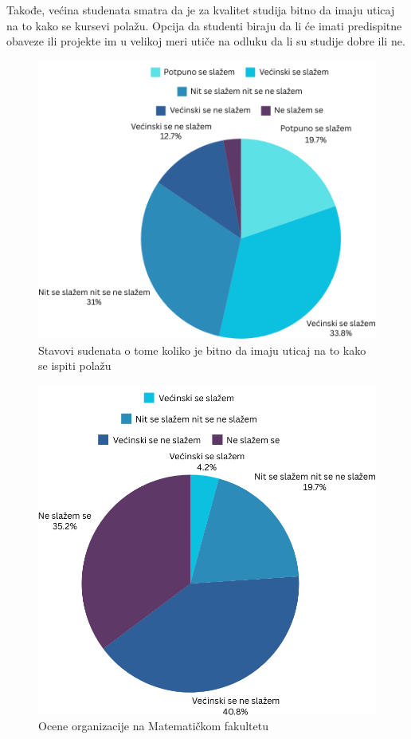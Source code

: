\documentclass[a4paper]{article}
\begin{document}
{Takođe, većina studenata smatra da je za kvalitet studija bitno da imaju uticaj na to kako se kursevi polažu. Opcija da studenti biraju da li će imati predispitne obaveze ili projekte im u velikoj meri utiče na odluku da li su studije dobre ili ne.
\begin{figure}[h!]
\begin{center}
    \includegraphics[scale = 0.3]{PieChartUticajNaPolaganje.png}
    \caption{Stavovi sudenata o tome koliko je bitno da imaju uticaj na to kako se ispiti polažu}
    \label{fig:uticaj}
\end{center}
\end{figure}


\begin{figure}[h!]
\begin{center}
    \includegraphics[scale = 0.3]{PieChartOrganizacijaMatf.png}
    \caption{Ocene organizacije na Matematičkom fakultetu}
    \label{fig:organizacija_matf}
\end{center}
\end{figure}

}
\end{document}
